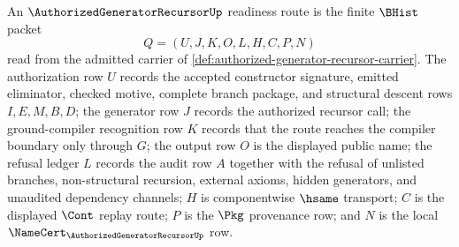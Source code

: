 \begin{definition}
\label{def:authorized-generator-recursor-readiness-route}
An $\AuthorizedGeneratorRecursorUp$ readiness route is the finite $\BHist$
packet
$$
Q=(U,J,K,O,L,H,C,P,N)
$$
read from the admitted carrier of
\autoref{def:authorized-generator-recursor-carrier}. The authorization row
$U$ records the accepted constructor signature, emitted eliminator, checked
motive, complete branch package, and structural descent rows
$I,E,M,B,D$; the generator row $J$ records the authorized recursor call; the
ground-compiler recognition row $K$ records that the route reaches the
compiler boundary only through $G$; the output row $O$ is the displayed public
name; the refusal ledger $L$ records the audit row $A$ together with the
refusal of unlisted branches, non-structural recursion, external axioms, hidden
generators, and unaudited dependency channels; $H$ is componentwise $\hsame$
transport; $C$ is the displayed $\Cont$ replay route; $P$ is the $\Pkg$
provenance row; and $N$ is the local
$\NameCert_{\AuthorizedGeneratorRecursorUp}$ row.
\end{definition}

